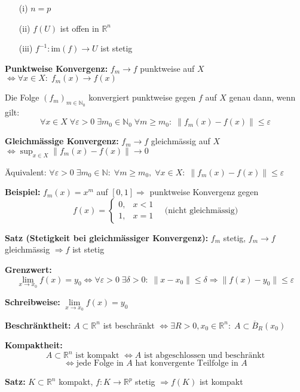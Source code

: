 \begin{itemize}
\begin{itemize}
  \item[(i)] \(n = p\)
  \item[(ii)] \(f(U)\) ist offen in \(\mathbb{R}^n\)
  \item[(iii)] \(f^{-1}: \text{im}(f) \to U\) ist stetig
\end{itemize}


\textbf{Punktweise Konvergenz:}  
\(f_m \to f\) punktweise auf \(X\)  
\(\Leftrightarrow \forall x \in X:\; f_m(x) \to f(x)\)

Die Folge $(f_m)_{m \in \mathbb{N}_0}$ konvergiert punktweise gegen $f$ auf $X$ genau dann, wenn gilt:
\[
\forall x \in X\; \forall \varepsilon > 0\; \exists m_0 \in \mathbb{N}_0\; \forall m \ge m_0:\; \|f_m(x) - f(x)\| \le \varepsilon
\]

\textbf{Gleichmässige Konvergenz:}  
\(f_m \to f\) gleichmässig auf \(X\)  
\(\Leftrightarrow \sup_{x \in X} \|f_m(x) - f(x)\| \to 0\)

Äquivalent:  
\(\forall \varepsilon > 0\; \exists m_0 \in \mathbb{N}:\; \forall m \ge m_0,\; \forall x \in X:\; \|f_m(x) - f(x)\| \le \varepsilon\)

\textbf{Beispiel:} \(f_m(x) = x^m\) auf \([0,1] \Rightarrow\) punktweise Konvergenz gegen  
\[
f(x) = \begin{cases}
0, & x < 1 \\
1, & x = 1
\end{cases}
\quad \text{(nicht gleichmässig)}
\]

\textbf{Satz (Stetigkeit bei gleichmässiger Konvergenz):}  
\(f_m\) stetig,\; \(f_m \to f\) gleichmässig \(\Rightarrow f\) ist stetig


\textbf{Grenzwert:}  
\[
\lim_{x \to x_0} f(x) = y_0 \Leftrightarrow
\forall \varepsilon > 0\; \exists \delta > 0:\;
\|x - x_0\| \leq \delta \Rightarrow \|f(x) - y_0\| \leq \varepsilon
\]

\textbf{Schreibweise:}  
\( \lim\limits_{x \to x_0} f(x) = y_0 \)

\textbf{Beschränktheit:}  
\(A \subset \mathbb{R}^n\) ist beschränkt \(\Leftrightarrow \exists R > 0, x_0 \in \mathbb{R}^n:\; A \subset \overline{B}_R(x_0)\)

\textbf{Kompaktheit:}  
\[
A \subset \mathbb{R}^n \text{ ist kompakt } \Leftrightarrow A \text{ ist abgeschlossen und beschränkt}
\]
\[
\Leftrightarrow \text{jede Folge in } A \text{ hat konvergente Teilfolge in } A
\]

\textbf{Satz:}  
\(K \subset \mathbb{R}^n\) kompakt,\; \(f: K \to \mathbb{R}^p\) stetig  
\(\Rightarrow f(K)\) ist kompakt


\end{itemize}
